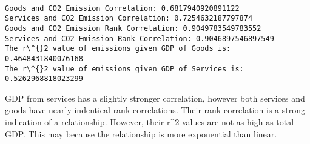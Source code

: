 \documentclass[11pt]{article}
\begin{document}
    \begin{center}
    \end{center}
    { \hspace*{\fill} \\}
    
    \begin{Verbatim}[commandchars=\\\{\}]
Goods and CO2 Emission Correlation: 0.6817940920891122
Services and CO2 Emission Correlation: 0.7254632187797874
Goods and CO2 Emission Rank Correlation: 0.9049783549783552
Services and CO2 Emission Rank Correlation: 0.9046897546897549
The r\^{}2 value of emissions given GDP of Goods is: 0.4648431840076168
The r\^{}2 value of emissions given GDP of Services is: 0.5262968818023299

    \end{Verbatim}

    GDP from services has a slightly stronger correlation, however both
services and goods have nearly indentical rank correlations. Their rank
correlation is a strong indication of a relationship. However, their
r\^{}2 values are not as high as total GDP. This may because the
relationship is more exponential than linear.
\end{document}
